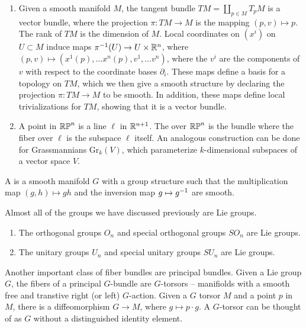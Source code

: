 \begin{exmp} \enumbreak
\begin{enumerate}
  \item Given a smooth manifold $M$, the tangent bundle $TM = \coprod_{p \in M} T_pM$
  is a vector bundle, where the projection $\pi : TM \to M$ is the mapping
  $(p,v) \mapsto p$. The rank of $TM$ is the dimension of $M$.
  Local coordinates on $(x^i)$ on $U \subset M$ induce maps
  $\pi^{-1}(U) \to U \times \mathbb{R}^n$, where
  $(p,v) \mapsto (x^1(p), \ldots x^n(p), v^1, \ldots v^n)$, where the $v^i$ are
  the components of $v$ with respect to the coordinate bases $\partial_i$.
  These maps define a basis for a topology on $TM$, which we then give
  a smooth structure by declaring the projection $\pi : TM \to M$ to be
  smooth. In addition, these maps define local trivializations for $TM$,
  showing that it is a vector bundle.
  \item A point in $\mathbb{RP}^n$ is a line $\ell$ in $\mathbb{R}^{n+1}$. The  over $\mathbb{RP}^n$ is the bundle where the fiber over $\ell$ is the subspace
  $\ell$ itself. An analogous construction can be done for Grassmannians
  $\mathrm{Gr}_k(V)$, which parameterize $k$-dimensional subspaces of
  a vector space $V$.
\qedhere\end{enumerate}
\end{exmp}
%
\begin{defn}
A  is a smooth manifold $G$ with a group structure such that the
multiplication map $(g,h) \mapsto gh$ and the inversion map $g \mapsto g^{-1}$
are smooth.
\end{defn}
%
Almost all of the groups we have discussed previously are Lie groups.
\begin{exmp} \enumbreak
\begin{enumerate}
  \item The orthogonal groups $O_n$ and special orthogonal groups $SO_n$ are Lie groups.
  \item The unitary groups $U_n$ and special unitary groups $SU_n$ are Lie groups.
\qedhere\end{enumerate}
\end{exmp}
%
Another important class of fiber bundles are principal bundles. Given a
Lie group $G$, the fibers of a principal $G$-bundle are $G$-torsors --
manifiolds with a smooth free and transtive right (or left) $G$-action.
Given a $G$ torsor $M$ and a point $p$ in $M$, there is a diffeomorphism
$G \to M$, where $g \mapsto p \cdot g$. A $G$-torsor can be thought
of as $G$ without a distinguished identity element.
